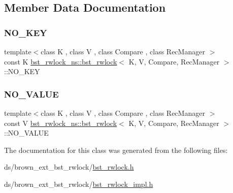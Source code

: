 \subsection{Member Data Documentation}
\mbox{\label{classbst__rwlock__ns_1_1bst__rwlock_aaf0250aff9b47856f94043733aabcf41}} 
\subsubsection{\texorpdfstring{N\+O\+\_\+\+K\+EY}{NO\_KEY}}
{\footnotesize\ttfamily template$<$class K , class V , class Compare , class Rec\+Manager $>$ \\
const K \hyperlink{classbst__rwlock__ns_1_1bst__rwlock}{bst\+\_\+rwlock\+\_\+ns\+::bst\+\_\+rwlock}$<$ K, V, Compare, Rec\+Manager $>$\+::N\+O\+\_\+\+K\+EY}

\mbox{\label{classbst__rwlock__ns_1_1bst__rwlock_a64d3ed4583e983e4cfc71fdb18cc233c}} 
\subsubsection{\texorpdfstring{N\+O\+\_\+\+V\+A\+L\+UE}{NO\_VALUE}}
{\footnotesize\ttfamily template$<$class K , class V , class Compare , class Rec\+Manager $>$ \\
const V \hyperlink{classbst__rwlock__ns_1_1bst__rwlock}{bst\+\_\+rwlock\+\_\+ns\+::bst\+\_\+rwlock}$<$ K, V, Compare, Rec\+Manager $>$\+::N\+O\+\_\+\+V\+A\+L\+UE}



The documentation for this class was generated from the following files\+:\begin{DoxyCompactItemize}
\item 
ds/brown\+\_\+ext\+\_\+bst\+\_\+rwlock/\hyperlink{bst__rwlock_8h}{bst\+\_\+rwlock.\+h}\item 
ds/brown\+\_\+ext\+\_\+bst\+\_\+rwlock/\hyperlink{bst__rwlock__impl_8h}{bst\+\_\+rwlock\+\_\+impl.\+h}\end{DoxyCompactItemize}
